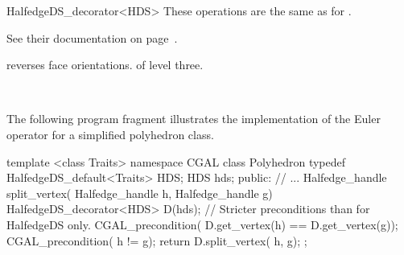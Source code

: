 \begin{ccRefClass}{HalfedgeDS_decorator<HDS>}
These operations are the same as for
.
\begin{ccTexOnly}
    See their documentation on page~\pageref{pageHalfedgeDSconstDecoratorRef}.
\end{ccTexOnly}




    {reverses face orientations. \ccPrecond {} of level three.}


\ccSeeAlso

\\

\ccExample

The following program fragment illustrates the implementation of the
Euler operator  for a simplified polyhedron class.

\begin{ccExampleCode}
template <class Traits>
namespace CGAL {
    class Polyhedron {
        typedef HalfedgeDS_default<Traits> HDS;
        HDS hds;
    public:
        // ...
        Halfedge_handle split_vertex( Halfedge_handle h, Halfedge_handle g) {
            HalfedgeDS_decorator<HDS> D(hds);
            // Stricter preconditions than for HalfedgeDS only.
            CGAL_precondition( D.get_vertex(h) == D.get_vertex(g));
            CGAL_precondition( h != g);
            return D.split_vertex( h, g);
        }
    };
}
\end{ccExampleCode}

\end{ccRefClass}

\ccRefPageEnd

